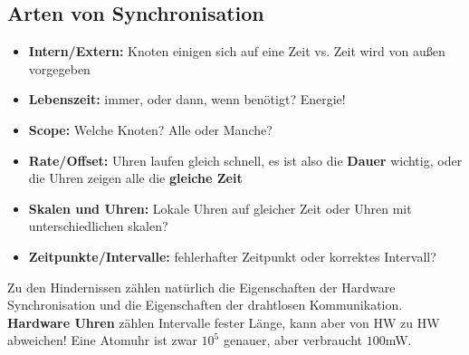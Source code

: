 \documentclass[a4paper]{article}
\begin{document}
\subsection{Arten von Synchronisation}
\begin{itemize}
	\item \textbf{Intern/Extern:} Knoten einigen sich auf eine Zeit vs. Zeit wird von außen vorgegeben
	\item \textbf{Lebenszeit:} immer, oder dann, wenn benötigt? Energie!
	\item \textbf{Scope:} Welche Knoten? Alle oder Manche?
	\item \textbf{Rate/Offset:} Uhren laufen gleich schnell, es ist also die \textbf{Dauer} wichtig, oder die Uhren zeigen alle die \textbf{gleiche Zeit}
	\item \textbf{Skalen und Uhren:} Lokale Uhren auf gleicher Zeit oder Uhren mit unterschiedlichen skalen?
	\item \textbf{Zeitpunkte/Intervalle:} fehlerhafter Zeitpunkt oder korrektes Intervall?
\end{itemize}
Zu den Hindernissen zählen natürlich die Eigenschaften der Hardware Synchronisation und die Eigenschaften der drahtlosen Kommunikation. \textbf{Hardware Uhren} zählen Intervalle fester Länge, kann aber von HW zu HW abweichen! Eine Atomuhr ist zwar $10^5$ genauer, aber verbraucht $100$mW.
	
	
	
	
	
	
	
	
	
	
	
	
	
	
	
	
	
	
	
	
	
	
\end{document}
